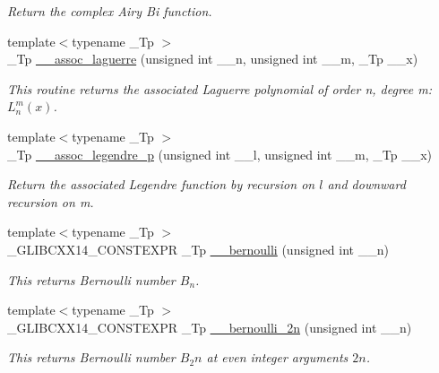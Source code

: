 \begin{DoxyCompactItemize}
\begin{DoxyCompactList}\small\item\em Return the complex Airy Bi function. \end{DoxyCompactList}\item 
{\footnotesize template$<$typename \+\_\+\+Tp $>$ }\\\+\_\+\+Tp \hyperlink{namespacestd_1_1____detail_a7d47c4512f7c6914f5504fde6ffa31fb}{\+\_\+\+\_\+assoc\+\_\+laguerre} (unsigned int \+\_\+\+\_\+n, unsigned int \+\_\+\+\_\+m, \+\_\+\+Tp \+\_\+\+\_\+x)
\begin{DoxyCompactList}\small\item\em This routine returns the associated Laguerre polynomial of order n, degree m\+: $ L_n^m(x) $. \end{DoxyCompactList}\item 
{\footnotesize template$<$typename \+\_\+\+Tp $>$ }\\\+\_\+\+Tp \hyperlink{namespacestd_1_1____detail_a8b31886e334427566b1b00d71052191b}{\+\_\+\+\_\+assoc\+\_\+legendre\+\_\+p} (unsigned int \+\_\+\+\_\+l, unsigned int \+\_\+\+\_\+m, \+\_\+\+Tp \+\_\+\+\_\+x)
\begin{DoxyCompactList}\small\item\em Return the associated Legendre function by recursion on $ l $ and downward recursion on m. \end{DoxyCompactList}\item 
{\footnotesize template$<$typename \+\_\+\+Tp $>$ }\\\+\_\+\+G\+L\+I\+B\+C\+X\+X14\+\_\+\+C\+O\+N\+S\+T\+E\+X\+PR \+\_\+\+Tp \hyperlink{namespacestd_1_1____detail_a68ae2aecb4cdf37b72cd60409cdc500c}{\+\_\+\+\_\+bernoulli} (unsigned int \+\_\+\+\_\+n)
\begin{DoxyCompactList}\small\item\em This returns Bernoulli number $ B_n $. \end{DoxyCompactList}\item 
{\footnotesize template$<$typename \+\_\+\+Tp $>$ }\\\+\_\+\+G\+L\+I\+B\+C\+X\+X14\+\_\+\+C\+O\+N\+S\+T\+E\+X\+PR \+\_\+\+Tp \hyperlink{namespacestd_1_1____detail_abd0b1f05f2b32a21cad034b38473bb8b}{\+\_\+\+\_\+bernoulli\+\_\+2n} (unsigned int \+\_\+\+\_\+n)
\begin{DoxyCompactList}\small\item\em This returns Bernoulli number $ B_2n $ at even integer arguments $ 2n $. \end{DoxyCompactList}\item 

\end{DoxyCompactItemize}
